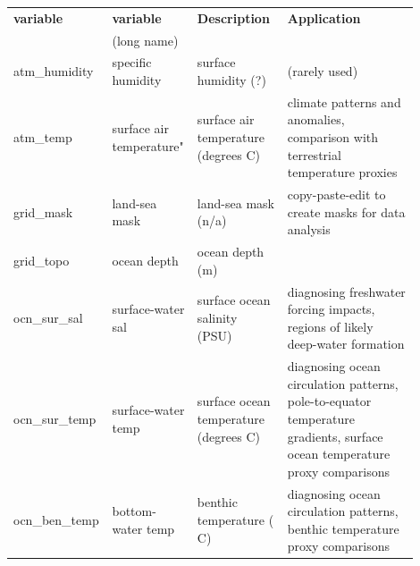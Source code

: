 \documentclass[11pt,fleqn]{book} %
\begin{document}
\begin{table}[ht]
\begin{tabular}{p{0.15\linewidth} p{0.20\linewidth} p{0.225\linewidth} p{0.325\linewidth}}
\toprule
\textbf{variable} & \textbf{variable} & \textbf{Description} & \textbf{Application}\\
 & (long name) & &\\
\midrule

\textsf{\footnotesize atm\_humidity} & \textsf{\footnotesize specific humidity} & \small{surface humidity (?)} & \small{(rarely used)}\\
\textsf{\footnotesize atm\_temp} & \textsf{\footnotesize surface air temperature"} & \small{surface air temperature (degrees C)} & \small{climate patterns and anomalies, comparison with terrestrial temperature proxies}\\
\midrule
\textsf{\footnotesize grid\_mask} & \textsf{\footnotesize land-sea mask} & \small{land-sea mask (n/a)} & \small{copy-paste-edit to create masks for data analysis}\\
\textsf{\footnotesize grid\_topo} & \textsf{\footnotesize ocean depth} & \small{ocean depth (m)} & \\

\midrule

\textsf{\footnotesize ocn\_sur\_sal} & \textsf{\footnotesize surface-water sal} & \small{surface ocean salinity (PSU)} & \small{diagnosing freshwater forcing impacts, regions of likely deep-water formation}\\
\textsf{\footnotesize ocn\_sur\_temp} & \textsf{\footnotesize surface-water temp} & \small{surface ocean temperature (degrees C)} & \small{diagnosing ocean circulation patterns, pole-to-equator temperature gradients, surface ocean temperature proxy comparisons}\\
\textsf{\footnotesize ocn\_ben\_temp} & \textsf{\footnotesize bottom-water temp} & \small{benthic temperature ( C)} & \small{diagnosing ocean circulation patterns, benthic temperature proxy comparisons}\\

\midrule


\end{tabular}
\end{table}
\end{document}
